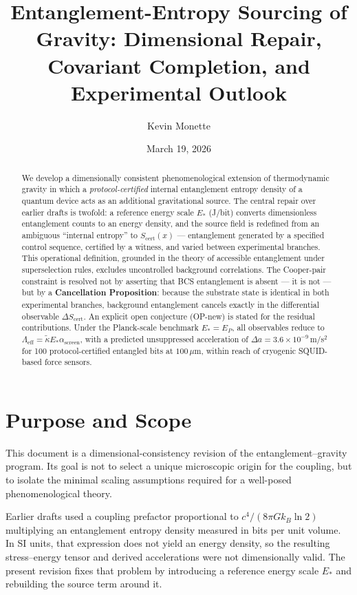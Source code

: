 \documentclass[11pt]{article}
\title{Entanglement-Entropy Sourcing of Gravity: Dimensional Repair,\\Covariant Completion, and Experimental Outlook}
\author{Kevin Monette}
\date{March 19, 2026}
\theoremstyle{plain}
\theoremstyle{definition}
\theoremstyle{remark}
\begin{document}
\maketitle

\begin{abstract}
We develop a dimensionally consistent phenomenological extension of thermodynamic gravity
in which a \emph{protocol-certified} internal entanglement entropy density of a quantum
device acts as an additional gravitational source.  The central repair over earlier drafts
is twofold: a reference energy scale $E_*$ (J/bit) converts dimensionless entanglement
counts to an energy density, and the source field is redefined from an ambiguous
``internal entropy'' to $S_{\mathrm{cert}}(x)$ --- entanglement generated by a specified
control sequence, certified by a witness, and varied between experimental branches.
This operational definition, grounded in the theory of accessible entanglement under
superselection rules, excludes uncontrolled background correlations.  The Cooper-pair
constraint is resolved not by asserting that BCS entanglement is absent --- it is not ---
but by a \textbf{Cancellation Proposition}: because the substrate state is identical
in both experimental branches, background entanglement cancels exactly in the differential
observable $\Delta S_{\mathrm{cert}}$.  An explicit open conjecture (OP-new) is stated
for the residual contributions.  Under the Planck-scale benchmark $E_* = E_P$, all
observables reduce to $\Lambda_{\mathrm{eff}} = \tilde{\kappa}E_*\alpha_{\mathrm{screen}}$,
with a predicted unsuppressed acceleration of $\Delta a = 3.6\times10^{-9}$\,m/s$^2$
for 100 protocol-certified entangled bits at $100\,\mu$m, within reach of cryogenic
SQUID-based force sensors.
\end{abstract}

\section{Purpose and Scope}

This document is a dimensional-consistency revision of the entanglement--gravity program. Its goal is not to select a unique microscopic origin for the coupling, but to isolate the minimal scaling assumptions required for a well-posed phenomenological theory.

Earlier drafts used a coupling prefactor proportional to $c^4/(8\pi G k_B \ln 2)$ multiplying an entanglement entropy density measured in bits per unit volume. In SI units, that expression does not yield an energy density, so the resulting stress--energy tensor and derived accelerations were not dimensionally valid. The present revision fixes that problem by introducing a reference energy scale $E_*$ and rebuilding the source term around it.
\end{document}
